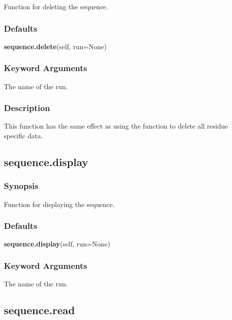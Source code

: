 Function for deleting the sequence.

\subsubsection{Defaults}

\textsf{\textbf{sequence.delete}(self, run=None)}


\subsubsection{Keyword Arguments}


  The name of the run.

\subsubsection{Description}

This function has the same effect as using the 
 function to delete  all residue
specific data.


\newpage

\subsection{sequence.display}


\subsubsection{Synopsis}

Function for displaying the sequence.

\subsubsection{Defaults}

\textsf{\textbf{sequence.display}(self, run=None)}


\subsubsection{Keyword Arguments}


  The name of the run.


\newpage

\subsection{sequence.read}



